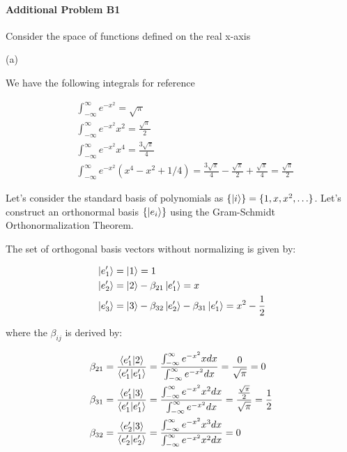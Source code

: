\documentclass{article}
\begin{document}
\paragraph{Additional Problem B1}

Consider the space of functions defined on the real x-axis

(a) 

We have the following integrals for reference 

\begin{align*}
&\int_{-\infty}^{\infty} e^{-x^2} = \sqrt{\pi} \\
&\int_{-\infty}^{\infty} e^{-x^2} x^2 = \frac{\sqrt{\pi}}{2} \\
 &\int_{-\infty}^{\infty} e^{-x^2} x^4 = \frac{3\sqrt{\pi}}{4} \\
&\int_{-\infty}^{\infty} e^{-x^2} (x^4 - x^2 + 1/4) = \frac{3\sqrt{\pi}}{4} - \frac{\sqrt{\pi}}{2} + \frac{\sqrt{\pi}}{4} = \frac{\sqrt{\pi}}{2}
\end{align*}

Let's consider the standard basis of polynomials as $\{\ket{i}\} = \{1, x, x^2 ,\ldots \}$. Let's construct an orthonormal basis $\{\ket{e_i}\}$ using the Gram-Schmidt Orthonormalization Theorem.

The set of orthogonal basis vectors without normalizing is given by:

\begin{align*}
&\ket{e'_1} = \ket{1} = 1 \\
&\ket{e'_2} = \ket{2} - \beta_{21} \ket{e'_1} = x  \\
&\ket{e'_3} = \ket{3} - \beta_{32} \ket{e'_2} - \beta_{31} \ket{e'_1} = x^2 - \frac{1}{2}
\end{align*}

where the $\beta_{ij}$ is derived by:

\begin{align*}
&\beta_{21} = \frac{\bra{e'_1} \ket{2}}{\bra{e'_1} \ket{e'_1}} = \frac{\int_{-\infty}^{\infty} e^{-x^2} x dx}{\int_{-\infty}^{\infty}e^{-x^2} dx} = \frac{0}{\sqrt{\pi}} = 0 \\
&\beta_{31} = \frac{\bra{e'_1}\ket{3}}{\bra{e'_1}\ket{e'_1}} = \frac{\int_{-\infty}^{\infty} e^{-x^2} x^2 dx}{\int_{-\infty}^{\infty}e^{-x^2} dx} = \frac{\frac{\sqrt{\pi}}{2}}{\sqrt{\pi}} = \frac{1}{2} \\
&\beta_{32} = \frac{\bra{e'_2}\ket{3}}{\bra{e'_2}\ket{e'_2}} = \frac{\int_{-\infty}^{\infty} e^{-x^2} x^3 dx}{\int_{-\infty}^{\infty}e^{-x^2} x^2 dx} = 0
\end{align*}
\end{document}

